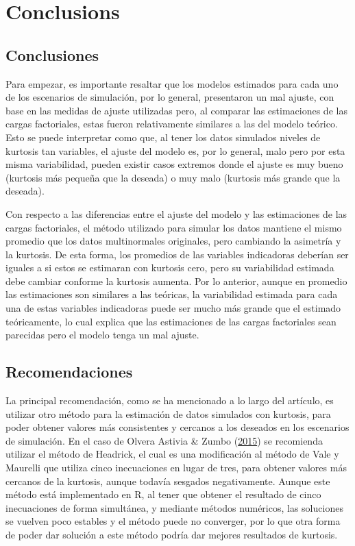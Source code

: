 \documentclass[
  english]{revcoles}
\begin{document}
\section{Conclusions}

\subsection{Conclusiones}

Para empezar, es importante resaltar que los modelos estimados para cada
uno de los escenarios de simulación, por lo general, presentaron un mal
ajuste, con base en las medidas de ajuste utilizadas pero, al comparar
las estimaciones de las cargas factoriales, estas fueron relativamente
similares a las del modelo teórico. Esto se puede interpretar como que,
al tener los datos simulados niveles de kurtosis tan variables, el
ajuste del modelo es, por lo general, malo pero por esta misma
variabilidad, pueden existir casos extremos donde el ajuste es muy bueno
(kurtosis más pequeña que la deseada) o muy malo (kurtosis más grande
que la deseada).

Con respecto a las diferencias entre el ajuste del modelo y las
estimaciones de las cargas factoriales, el método utilizado para simular
los datos mantiene el mismo promedio que los datos multinormales
originales, pero cambiando la asimetría y la kurtosis. De esta forma,
los promedios de las variables indicadoras deberían ser iguales a si
estos se estimaran con kurtosis cero, pero su variabilidad estimada debe
cambiar conforme la kurtosis aumenta. Por lo anterior, aunque en
promedio las estimaciones son similares a las teóricas, la variabilidad
estimada para cada una de estas variables indicadoras puede ser mucho
más grande que el estimado teóricamente, lo cual explica que las
estimaciones de las cargas factoriales sean parecidas pero el modelo
tenga un mal ajuste.

\subsection{Recomendaciones}

La principal recomendación, como se ha mencionado a lo largo del
artículo, es utilizar otro método para la estimación de datos simulados
con kurtosis, para poder obtener valores más consistentes y cercanos a
los deseados en los escenarios de simulación. En el caso de Olvera
Astivia \& Zumbo (\protect\hyperlink{ref-OlveraAstivia2015}{2015}) se
recomienda utilizar el método de Headrick, el cual es una modificación
al método de Vale y Maurelli que utiliza cinco inecuaciones en lugar de
tres, para obtener valores más cercanos de la kurtosis, aunque todavía
sesgados negativamente. Aunque este método está implementado en R, al
tener que obtener el resultado de cinco inecuaciones de forma
simultánea, y mediante métodos numéricos, las soluciones se vuelven poco
estables y el método puede no converger, por lo que otra forma de poder
dar solución a este método podría dar mejores resultados de kurtosis.
\end{document}
